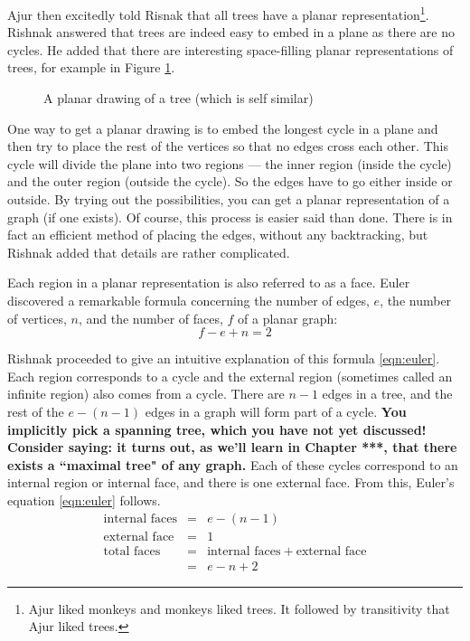  Ajur then excitedly told Risnak that all trees have a planar representation\footnote{Ajur liked monkeys and monkeys liked trees. It followed by transitivity that Ajur liked trees.}. Rishnak answered that trees are indeed easy to embed in a plane as there are
 no cycles. He added that there are interesting space-filling planar representations of trees, for example in Figure \ref{9g7}.
\begin{figure}
\begin{center}    

  \caption{ A planar drawing of a tree (which is self similar)}\label{9g7}
  \end{center}
\end{figure}

One way to get a planar drawing is to embed the longest cycle in a plane and then try to place the rest of the vertices so that no edges cross each other. This cycle will divide the plane into two regions --- the inner region (inside the cycle) and the outer region (outside the cycle). So the edges have to go either inside or outside. By trying out the possibilities, you can get a planar representation of a graph (if one exists). Of course, this process is easier said than done. There is in fact an efficient method of placing the edges, without any backtracking, but Rishnak added that details are rather complicated. 

Each region in a planar representation is also referred to as a face. Euler discovered a remarkable formula concerning the number of edges, $e$, the number of vertices, $n$, and the number of faces, $f$ of a planar graph:
\begin{equation}
\label{eqn:euler}
  f-e+n=2 
\end{equation}

 

Rishnak proceeded to give an intuitive explanation of this formula \ref{eqn:euler}. Each region corresponds to a cycle and the external region (sometimes called an infinite region) also comes from a cycle. 
There are $n-1$ edges in a tree, and the rest of the $e-(n-1)$ edges in a graph will form part of a cycle. \textbf{You implicitly pick a spanning tree, which you have not yet discussed! Consider saying: it turns out, as we'll learn in Chapter ***, that there exists a ``maximal tree" of any graph.} Each of these cycles correspond to an internal region or internal face, and there is one external face. From this, Euler's equation \ref{eqn:euler} follows.
\begin{eqnarray}
    \label{eqn:cycles}
    \text{internal faces}&=&e-(n-1)\nonumber\\
    \text{external face}&=&1 \nonumber \\
    \text{total faces}&=& \text{internal faces}~+~\text{external face} \nonumber \\
    &=&e-n+2
\end{eqnarray}

